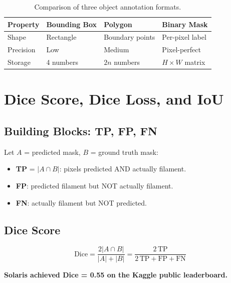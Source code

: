 \documentclass[12pt,a4paper,openany]{report}
\begin{document}
\begin{table}[H]
\centering
\caption{Comparison of three object annotation formats.}
\renewcommand{\arraystretch}{1.3}
\begin{tabular}{l p{3.2cm} p{3.2cm} p{3.2cm}}
\toprule
\textbf{Property} & \textbf{Bounding Box} & \textbf{Polygon} & \textbf{Binary Mask} \\
\midrule
Shape       & Rectangle    & Boundary points & Per-pixel label \\
Precision   & Low          & Medium          & Pixel-perfect \\
Storage     & 4 numbers    & $2n$ numbers    & $H\times W$ matrix \\
\bottomrule
\end{tabular}
\label{tab:annformat}
\end{table}

\chapter{Dice Score, Dice Loss, and IoU}

\section{Building Blocks: TP, FP, FN}

Let $A$ = predicted mask, $B$ = ground truth mask:
\begin{itemize}
  \item \textbf{TP} = $|A\cap B|$: pixels predicted AND actually filament.
  \item \textbf{FP}: predicted filament but NOT actually filament.
  \item \textbf{FN}: actually filament but NOT predicted.
\end{itemize}

\section{Dice Score}

\begin{equation}
  \text{Dice} = \frac{2|A\cap B|}{|A|+|B|}
              = \frac{2\,\text{TP}}{2\,\text{TP}+\text{FP}+\text{FN}}
  \label{eq:dice}
\end{equation}

\textbf{Solaris achieved Dice = 0.55 on the Kaggle public leaderboard.}
\end{document}
